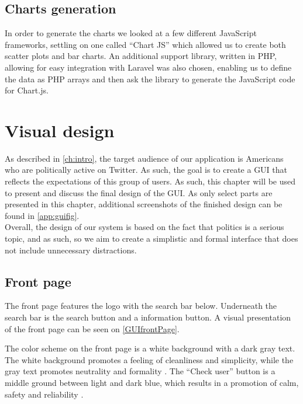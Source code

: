 \subsection{Charts generation}
In order to generate the charts we looked at a few different JavaScript
frameworks, settling on one called ``Chart JS'' which allowed us to create
both scatter plots and bar charts. An additional support library, written in
PHP, allowing for easy integration with Laravel was also chosen, enabling us to
define the data as PHP arrays and then ask the library to generate the
JavaScript code for Chart.js.

\section{Visual design} \label{sec:gui-visual-design}
As described in \autoref{ch:intro}, the target audience of our application is
Americans who are politically active on Twitter. As such, the goal is to create
a GUI that reflects the expectations of this group of users. As such, this
chapter will be used to present and discuss the final design of the GUI. As only
select parts are presented in this chapter, additional screenshots of the
finished design can be found in \autoref{app:guifig}. \\
Overall, the design of our system is based on the fact that politics is a
serious topic, and as such, so we aim to create a simplistic and formal
interface that does not include unnecessary distractions.

\subsection{Front page}
The front page features the logo with the search bar below. Underneath the
search bar is the search button and a information button. A visual presentation
of the front page can be seen on \autoref{GUIfrontPage}.

{}

The color scheme on the front page is a white background with a dark gray text.
The white background promotes a feeling of cleanliness and simplicity, while the
gray text promotes neutrality and formality \citep[p. 63 \& 64]{WebUI}. 
The ``Check user'' button is a middle ground between light and dark blue, which
results in a promotion of calm, safety and reliability \citep[p. 61]{WebUI}.

